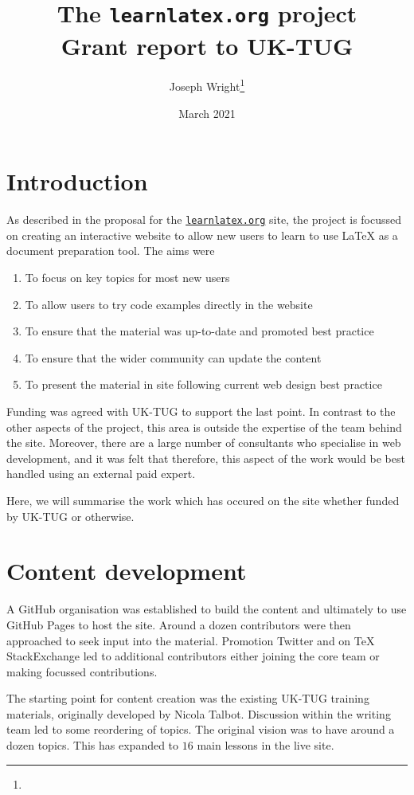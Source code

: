 \documentclass[a4paper]{article}
\author{Joseph Wright\thanks{\email{joseph.wright@morningstar2.co.uk}}}
\date{March 2021}
\title{The \nolinkurl{learnlatex.org} project\\Grant report to UK-TUG}
\begin{document}
\maketitle

\section{Introduction}

As described in the proposal for the \href{https://learnlatex.org}{\nolinkurl{learnlatex.org}} site, the project is
focussed on creating an interactive website to allow new users to learn to use
\LaTeX{} as a document preparation tool. The aims were
\begin{enumerate}
  \item To focus on key topics for most new users
  \item To allow users to try code examples directly in the website
  \item To ensure that the material was up-to-date and promoted
    best practice
  \item To ensure that the wider community can update the content
  \item To present the material in site following current web design
    best practice
\end{enumerate}

Funding was agreed with UK-TUG to support the last point. In contrast to the
other aspects of the project, this area is outside the expertise of the team
behind the site. Moreover, there are a large number of consultants who
specialise in web development, and it was felt that therefore, this aspect of
the work would be best handled using an external paid expert.

Here, we will summarise the work which has occured on the site whether funded
by UK-TUG or otherwise.

\section{Content development}

A GitHub organisation was established to build the content and ultimately to
use GitHub Pages to host the site. Around a dozen contributors were then
approached to seek input into the material. Promotion  Twitter and
on TeX StackExchange led to additional contributors either joining the core
team or making focussed contributions.

The starting point for content creation was the existing UK-TUG training
materials, originally developed by Nicola Talbot. Discussion within the writing
team led to some reordering of topics. The original vision was to have around a
dozen topics. This has expanded to $16$ main lessons in the live site.
\end{document}

